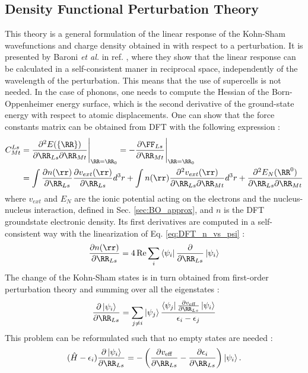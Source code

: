 \subsection{Density Functional Perturbation Theory}
This theory is a general formulation of the linear response of the Kohn-Sham wavefunctions and charge density obtained in  with respect to a perturbation. It is presented by Baroni \textit{et al.} in ref. \cite{baroni2001phonons}, where they show that the linear response can be calculated in a self-consistent maner in reciprocal space, independently of the wavelength of the perturbation. This means that the use of supercells is not needed. In the case of phonons, one needs to compute the Hessian of the Born-Oppenheimer energy surface, which is the second derivative of the ground-state energy with respect to atomic displacements. One can show that the force constants matrix can be obtained from \gls{DFT} with the following expression \cite{gonze1997dynamical} :
\begin{align}
\begin{split}
	C^{Ls}_{Mt} &= \frac{\partial^2 E(\{\RR\})}{\partial\RR_{Ls} \partial \RR_{Mt}} \Biggr|_{\RR=\RR_0} = - \frac{\partial \FF_{Ls}}{\partial \RR_{Mt}} \Biggr|_{\RR=\RR_0} \\
	&= \int \frac{\partial n(\rr)}{\partial \RR_{Ls}} \frac{\partial v_{ext}(\rr)}{\partial \RR_{Ls}} d^3r + \int n(\rr) \frac{\partial^2 v_{ext}(\rr)}{\partial \RR_{Ls} \partial \RR_{Mt}} d^3r + \frac{\partial^2 E_N(\RR^0) }{\partial \RR_{Ls} \partial \RR_{Mt}}
\end{split}
\end{align}
where $v_{ext}$ and $E_N$ are the ionic potential acting on the electrons and the nucleus-nucleus interaction, defined in Sec. \ref{sec:BO_approx}, and $n$ is the \gls{DFT} groundstate electronic density. Its first derivatives are computed in a self-consistent way with the linearization of Eq. \eqref{eq:DFT_n_vs_psi} :
\begin{equation}
	\frac{\partial n(\rr)}{\partial \RR_{Ls}} = 4\Re \sum_i \bra{\psi_i} \frac{\partial}{\partial \RR_{Ls}} \ket{\psi_i}
\end{equation}
The change of the Kohn-Sham states is in turn obtained from first-order perturbation theory and summing over all the eigenstates :
\begin{equation}
	\frac{\partial\ket{\psi_i}}{\partial \RR_{Ls}} = \sum_{j\neq i} \ket{\psi_j} \frac{\bra{\psi_j} \tfrac{\partial v_{\text{eff}}}{\partial\RR_{Ls}}\ket{\psi_i}}{\epsilon_i - \epsilon_j}
\end{equation}
This problem can be reformulated such that no empty states are needed :
\begin{equation}
	(\hat{H} - \epsilon_i) \frac{\partial\ket{\psi_i}}{\partial \RR_{Ls}} = - \left(\frac{\partial v_{\text{eff}}}{\partial\RR_{Ls}} - \frac{\partial \epsilon_i}{\partial\RR_{Ls}}  \right) \ket{\psi_i}.
\end{equation}

